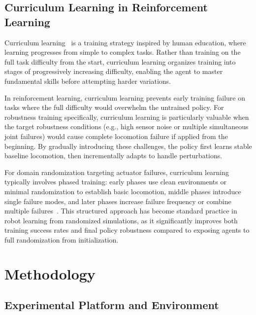 \documentclass[conference]{IEEEtran}
\begin{document}
\subsection{Curriculum Learning in Reinforcement Learning}

Curriculum learning~\cite{bengio2009curriculum} is a training strategy inspired by human education, where learning progresses from simple to complex tasks. Rather than training on the full task difficulty from the start, curriculum learning organizes training into stages of progressively increasing difficulty, enabling the agent to master fundamental skills before attempting harder variations.

In reinforcement learning, curriculum learning prevents early training failure on tasks where the full difficulty would overwhelm the untrained policy. For robustness training specifically, curriculum learning is particularly valuable when the target robustness conditions (e.g., high sensor noise or multiple simultaneous joint failures) would cause complete locomotion failure if applied from the beginning. By gradually introducing these challenges, the policy first learns stable baseline locomotion, then incrementally adapts to handle perturbations.

For domain randomization targeting actuator failures, curriculum learning typically involves phased training: early phases use clean environments or minimal randomization to establish basic locomotion, middle phases introduce single failure modes, and later phases increase failure frequency or combine multiple failures~\cite{muratore2022robot}. This structured approach has become standard practice in robot learning from randomized simulations, as it significantly improves both training success rates and final policy robustness compared to exposing agents to full randomization from initialization.


\section{Methodology}
\label{sec:methodology}

\subsection{Experimental Platform and Environment}
\end{document}
